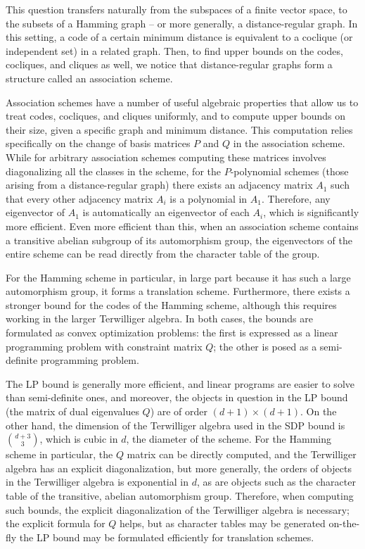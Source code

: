 \documentclass{report}
\begin{document}
  This question transfers naturally from the subspaces of a finite vector space,
  to the subsets of a Hamming graph -- or more generally, a distance-regular
  graph.  In this setting, a code of a certain minimum distance is equivalent to
  a coclique (or independent set) in a related graph.  Then, to find upper
  bounds on the codes, cocliques, and cliques as well, we notice that
  distance-regular graphs form a structure called an association scheme.

  Association schemes have a number of useful algebraic properties that allow us
  to treat codes, cocliques, and cliques uniformly, and to compute upper bounds
  on their size, given a specific graph and minimum distance.  This computation
  relies specifically on the change of basis matrices $P$ and $Q$ in the
  association scheme.  While for arbitrary association schemes computing these
  matrices involves diagonalizing all the classes in the scheme, for the
  $P$-polynomial schemes (those arising from a distance-regular graph) there
  exists an adjacency matrix $A_1$ such that every other adjacency matrix $A_i$
  is a polynomial in $A_1$.  Therefore, any eigenvector of $A_1$ is
  automatically an eigenvector of each $A_i$, which is significantly more
  efficient.  Even more efficient than this, when an association scheme contains
  a transitive abelian subgroup of its automorphism group, the eigenvectors of
  the entire scheme can be read directly from the character table of the group.

  For the Hamming scheme in particular, in large part because it has such a
  large automorphism group, it forms a translation scheme.  Furthermore, there
  exists a stronger bound for the codes of the Hamming scheme, although this
  requires working in the larger Terwilliger algebra.  In both cases, the bounds
  are formulated as convex optimization problems: the first is expressed as a
  linear programming problem with constraint matrix $Q$; the other is posed as a
  semi-definite programming problem.

  The LP bound is generally more efficient, and linear programs are easier to
  solve than semi-definite ones, and moreover, the objects in question in the LP
  bound (the matrix of dual eigenvalues $Q$) are of order $(d+1) \times (d+1)$.
  On the other hand, the dimension of the Terwilliger algebra used in the SDP
  bound is $\binom{d+3}{3}$, which is cubic in $d$, the diameter of the scheme.
  For the Hamming scheme in particular, the $Q$ matrix can be directly computed,
  and the Terwilliger algebra has an explicit diagonalization, but more
  generally, the orders of objects in the Terwilliger algebra is exponential in
  $d$, as are objects such as the character table of the transitive, abelian
  automorphism group.  Therefore, when computing such bounds, the explicit
  diagonalization of the Terwilliger algebra is necessary; the explicit formula
  for $Q$ helps, but as character tables may be generated on-the-fly the LP
  bound may be formulated efficiently for translation schemes.
\end{document}
